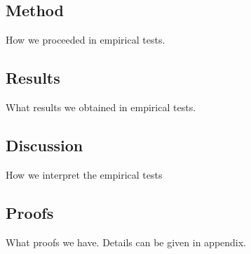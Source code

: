 \documentclass{article}
\begin{document}
\subsection{Method}
How we proceeded in empirical tests.
\subsection{Results}
What results we obtained in empirical tests.
\subsection{Discussion}
How we interpret the empirical tests
\subsection{Proofs}
What proofs we have. Details can be given in appendix.
%
%
\end{document}

